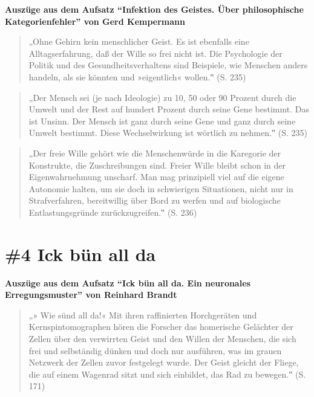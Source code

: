 \documentclass[
  a4paper,
]{report}
\begin{document}
\textbf{Auszüge aus dem Aufsatz ``Infektion des Geistes. Über philosophische Kategorienfehler'' von Gerd Kempermann \citeyearpar{Kempermann2004}}

\begin{quote}
„Ohne Gehirn kein menschlicher Geist. Es ist ebenfalls eine Alltagserfahrung, daß der Wille so frei nicht ist. Die Psychologie der Politik und des Gesundheitsverhaltens sind Beispiele, wie Menschen anders handeln, als sie könnten und »eigentlich« wollen.‟ (S. 235)
\end{quote}

\begin{quote}
„Der Mensch sei (je nach Ideologie) zu 10, 50 oder 90 Prozent durch die Umwelt und der Rest auf hundert Prozent durch seine Gene bestimmt. Das ist Unsinn. Der Mensch ist ganz durch seine Gene und ganz durch seine Umwelt bestimmt. Diese Wechselwirkung ist wörtlich zu nehmen.‟ (S. 235)
\end{quote}

\begin{quote}
„Der freie Wille gehört wie die Menschenwürde in die Karegorie der Konstrukte, die Zuschreibungen sind. Freier Wille bleibt schon in der Eigenwahrnehmung unscharf. Man mag prinzipiell viel auf die eigene Autonomie halten, um sie doch in schwierigen Situationen, nicht nur in Strafverfahren, bereitwillig über Bord zu werfen und auf biologische Entlastungsgründe zurückzugreifen.‟ (S. 236)
\end{quote}

\hypertarget{pr-ev4}{%
\section{\#4 Ick bün all da}\label{pr-ev4}}

\textbf{Auszüge aus dem Aufsatz ``Ick bün all da. Ein neuronales Erregungsmuster'' von Reinhard Brandt \citeyearpar{Brandt2004}}

\begin{quote}
„» Wie sünd all da!« Mit ihren raffinierten Horchgeräten und Kernspintomographen hören die Forscher das homerische Gelächter der Zellen über den verwirrten Geist und den Willen der Menschen, die sich frei und selbständig dünken und doch nur ausführen, was im grauen Netzwerk der Zellen zuvor festgelegt wurde. Der Geist gleicht der Fliege, die auf einem Wagenrad sitzt und sich einbildet, das Rad zu bewegen.‟ (S. 171)
\end{quote}
\end{document}
